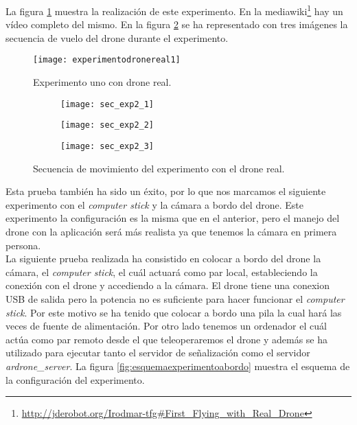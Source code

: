 La figura \ref{fig:experimentodronereal1} muestra la realización de este experimento. En la mediawiki\footnote{\url{http://jderobot.org/Irodmar-tfg\#First\_Flying\_with\_Real\_Drone}}\cite{Mediawiki} hay un vídeo completo del mismo. En la figura \ref{fig:secexp2} se ha representado con tres imágenes la secuencia de vuelo del drone durante el experimento.\\

\begin{figure}[h!]
\centering
\texttt{[image: experimentodronereal1]}
\caption{Experimento uno con drone real.}
\label{fig:experimentodronereal1}
\end{figure}


\begin{figure}[h!]
\centering
  \begin{subfigure}[]{48mm}
    \texttt{[image: sec\_exp2\_1]}
  \end{subfigure}
  \hspace{1pt}
  \begin{subfigure}[]{48mm}
    \texttt{[image: sec\_exp2\_2]}
  \end{subfigure}
    \hspace{1pt}
    \begin{subfigure}[]{48mm}
    \texttt{[image: sec\_exp2\_3]}
  \end{subfigure}
    \caption{Secuencia de movimiento del experimento con el drone real.}
  \label{fig:secexp2}
\end{figure}


Esta prueba también ha sido un éxito, por lo que nos marcamos el siguiente experimento con el \emph{computer stick} y la cámara a bordo del drone. Este experimento la configuración es la misma que en el anterior, pero el manejo del drone con la aplicación será más realista ya que tenemos la cámara en primera persona.\\


La siguiente prueba realizada ha consistido en colocar a bordo del drone la cámara, el \emph{computer stick}, el cuál actuará como par local, estableciendo la conexión con el drone y accediendo a la cámara. El drone tiene una conexion USB de salida pero la potencia no es suficiente para hacer funcionar el \emph{computer stick}. Por este motivo se ha tenido que colocar a bordo una pila la cual hará las veces de fuente de alimentación. Por otro lado tenemos un ordenador el cuál actúa como par remoto desde el que teleoperaremos el drone y además se ha utilizado para ejecutar tanto el servidor de señalización como el servidor \emph{ardrone\_server}. La figura \ref{fig:esquemaexperimentoabordo} muestra el esquema de la configuración del experimento.\\


